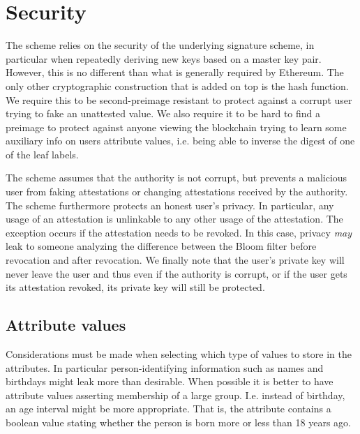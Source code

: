 \documentclass[11pt]{article} %
\begin{document}
\section{Security}
The scheme relies on the security of the underlying signature scheme, in particular when repeatedly deriving new keys based on a master key pair. However, this is no different than what is generally required by Ethereum. The only other cryptographic construction that is added on top is the hash function. We require this to be second-preimage resistant to protect against a corrupt user trying to fake an unattested value. We also require it to be hard to find a preimage to protect against anyone viewing the blockchain trying to learn some auxiliary info on users attribute values, i.e. being able to inverse the digest of one of the leaf labels.

The scheme assumes that the authority is not corrupt, but prevents a malicious user from faking attestations or changing attestations received by the authority. The scheme furthermore protects an honest user's privacy. In particular, any usage of an attestation is unlinkable to any other usage of the attestation. The exception occurs if the attestation needs to be revoked. In this case, privacy \emph{may} leak to someone analyzing the difference between the Bloom filter before revocation and after revocation. We finally note that the user's private key will never leave the user and thus even if the authority is corrupt, or if the user gets its attestation revoked, its private key will still be protected.

\subsection{Attribute values}
Considerations must be made when selecting which type of values to store in the attributes. In particular person-identifying information such as names and birthdays might leak more than desirable. When possible it is better to have attribute values asserting membership of a large group. I.e. instead of birthday, an age interval might be more appropriate. That is, the attribute contains a boolean value stating whether the person is born more or less than 18 years ago. 




\end{document}
